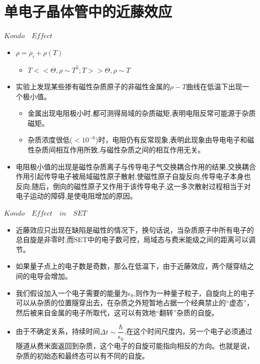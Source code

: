 \documentclass{beamer}[fontset=windows]
\begin{document}
    \section{单电子晶体管中的近藤效应}
    \begin{frame}
    \begin{block}{$Kondo \quad Effect$}
    \begin{itemize}
    \item $\rho=\rho_{i}+\rho(T)$
    \begin{itemize}
    \item $T<<\Theta,\rho\sim T^{5};T>>\Theta,\rho\sim T$
    \end{itemize}
    \item 实验上发现某些掺有磁性杂质原子的非磁性金属的$\rho-T$曲线在低温下出现一个极小值。
    \begin{itemize}
    \item 金属出现电阻极小时,都可测得局域的杂质磁矩,表明电阻反常可能源于杂质磁矩。
    \item 杂质浓度很低($<10^{-6}$)时，电阻仍有反常现象,表明此现象由导电电子和磁性杂质间相互作用所致,与磁性杂质之间的相互作用无关。
    \end{itemize}
    \item 电阻极小值的出现是磁性杂质离子与传导电子气交换耦合作用的结果,交换耦合作用引起传导电子被局域磁性原子散射,使磁性原子自旋反向,传导电子本身也反向;随后，倒向的磁性原子又作用于该传导电子,这一多次散射过程相当于对电子运动的障碍,是使电阻增加的原因。
    \end{itemize}
    \end{block}
    \end{frame}
    \begin{frame}
    \begin{block}{$Kondo\quad Effect\quad in \quad SET$}
    \begin{itemize}
    \item 近藤效应只出现在缺陷是磁性的情况下，换句话说，当杂质原子中所有电子的总自旋是非零时,而SET中的电子数可控，局域态与费米能级之间的距离可以调节。
    \item 如果量子点上的电子数是奇数，那么在低温下，由于近藤效应，两个隧穿结之间的电导会增加。
    \item 我们假设加入一个电子需要的能量为$\epsilon_{0}$,则作为一种量子粒子，自旋向上的电子可以从杂质的位置隧穿出去，在杂质之外短暂地占据一个经典禁止的“虚态”，然后被来自金属的电子所取代，这可以有效地“翻转”杂质的自旋。
    \item 由于不确定关系，持续时间$\Delta t\sim \dfrac{\hbar}{\epsilon_{0}}$,在这个时间尺度内，另一个电子必须通过隧道从费米面返回到杂质，这个电子的自旋可能指向相反的方向。也就是说，杂质的初始态和最终态可以有不同的自旋。
    \end{itemize}
    \end{block}
    \end{frame}
\end{document}
